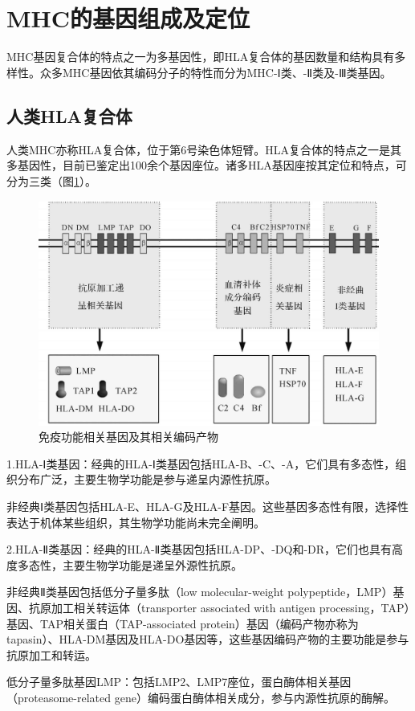 \section{MHC的基因组成及定位}

MHC基因复合体的特点之一为多基因性，即HLA复合体的基因数量和结构具有多样性。众多MHC基因依其编码分子的特性而分为MHC-Ⅰ类、-Ⅱ类及-Ⅲ类基因。


\subsection{人类HLA复合体}

人类MHC亦称HLA复合体，位于第6号染色体短臂。HLA复合体的特点之一是其多基因性，目前已鉴定出100余个基因座位。诸多HLA基因座按其定位和特点，可分为三类（图\ref{fig7-2}）。

\begin{figure}[!htbp]
 \centering
 \includegraphics[width=.6\textwidth]{./images/Image00103.jpg}
 \captionsetup{justification=centering}
 \caption{免疫功能相关基因及其相关编码产物}
 \label{fig7-2}
  \end{figure} 

1.HLA-Ⅰ类基因：经典的HLA-Ⅰ类基因包括HLA-B、-C、-A，它们具有多态性，组织分布广泛，主要生物学功能是参与递呈内源性抗原。

非经典Ⅰ类基因包括HLA-E、HLA-G及HLA-F基因。这些基因多态性有限，选择性表达于机体某些组织，其生物学功能尚未完全阐明。

2.HLA-Ⅱ类基因：经典的HLA-Ⅱ类基因包括HLA-DP、-DQ和-DR，它们也具有高度多态性，主要生物学功能是递呈外源性抗原。

非经典Ⅱ类基因包括低分子量多肽（low molecular-weight
polypeptide，LMP）基因、抗原加工相关转运体（transporter associated with
antigen processing，TAP）基因、TAP相关蛋白（TAP-associated
protein）基因（编码产物亦称为tapasin）、HLA-DM基因及HLA-DO基因等，这些基因编码产物的主要功能是参与抗原加工和转运。

低分子量多肽基因LMP：包括LMP2、LMP7座位，蛋白酶体相关基因（proteasome-related
gene）编码蛋白酶体相关成分，参与内源性抗原的酶解。

